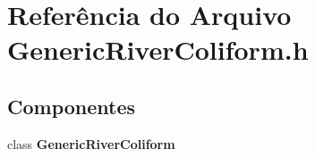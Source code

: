 \section{Referência do Arquivo Generic\+River\+Coliform.\+h}
\label{_generic_river_coliform_8h}
\subsection*{Componentes}
\begin{DoxyCompactItemize}
\item 
class {\bf Generic\+River\+Coliform}
\end{DoxyCompactItemize}

